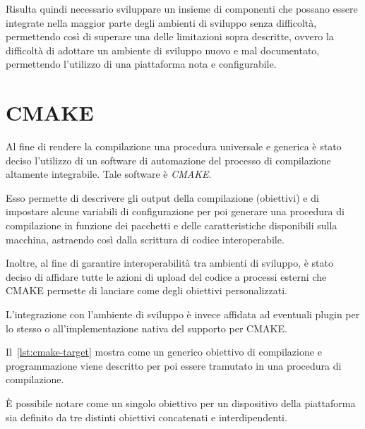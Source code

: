 Risulta quindi necessario sviluppare un insieme di componenti che possano essere integrate nella maggior parte degli ambienti di sviluppo senza difficoltà, permettendo così di superare una delle limitazioni sopra descritte, ovvero la difficoltà di adottare un ambiente di sviluppo nuovo e mal documentato, permettendo l'utilizzo di una piattaforma nota e configurabile.

\section{CMAKE}\label{s:cmake}

Al fine di rendere la compilazione una procedura universale e generica è stato deciso l'utilizzo di un software di automazione del processo di compilazione altamente integrabile. Tale software è \textit{CMAKE}.

Esso permette di descrivere gli output della compilazione (obiettivi) e di impostare alcune variabili di configurazione per poi generare una procedura di compilazione in funzione dei pacchetti e delle caratteristiche disponibili sulla macchina, astraendo così dalla scrittura di codice interoperabile.

Inoltre, al fine di garantire interoperabilità tra ambienti di sviluppo, è stato deciso di affidare tutte le azioni di upload del codice a processi esterni che CMAKE permette di lanciare come degli obiettivi personalizzati.

L'integrazione con l'ambiente di sviluppo è invece affidata ad eventuali plugin per lo stesso o all'implementazione nativa del supporto per CMAKE.\@

Il~\cref{lst:cmake-target} mostra come un generico obiettivo di compilazione e programmazione viene descritto per poi essere tramutato in una procedura di compilazione.

È possibile notare come un singolo obiettivo per un dispositivo della piattaforma sia definito da tre distinti obiettivi concatenati e interdipendenti.

